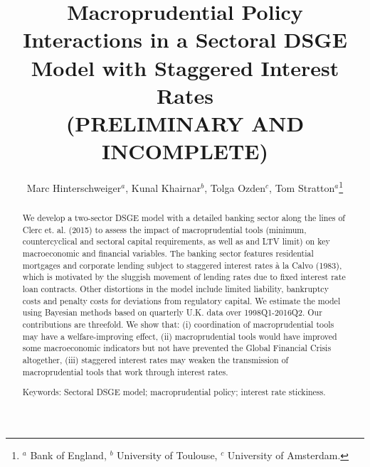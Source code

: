 \documentclass[12pt]{article}
\title{Macroprudential Policy Interactions in a Sectoral DSGE Model with Staggered Interest Rates \\
(PRELIMINARY AND INCOMPLETE)}
\author{Marc Hinterschweiger$^{a}$, Kunal Khairnar$^{b}$, Tolga Ozden$^{c}$, Tom Stratton$^{a}$\footnote{$^{a}$ Bank of England, $^{b}$ University of Toulouse, $^{c}$ University of Amsterdam.}}
\numberwithin{equation}{section}
\begin{document}
\maketitle



\begin{abstract}

We develop a two-sector DSGE model with a detailed banking sector along the lines of Clerc et. al. (2015) to assess the impact of macroprudential tools (minimum, countercyclical and sectoral capital requirements, as well as and LTV limit) on key macroeconomic and financial variables. The banking sector features residential mortgages and corporate lending subject to staggered interest rates à la Calvo (1983), which is motivated by the sluggish movement of lending rates due to fixed interest rate loan contracts. Other distortions in the model include limited liability, bankruptcy costs and penalty costs for deviations from regulatory capital. We estimate the model using Bayesian methods based on quarterly U.K. data over 1998Q1-2016Q2. Our contributions are threefold. We show that: (i) coordination of macroprudential tools may have a welfare-improving effect, (ii) macroprudential tools would have improved some macroeconomic indicators but not have prevented the Global Financial Crisis altogether, (iii) staggered interest rates may weaken the transmission of macroprudential tools that work through interest rates. 

\noindent

\vspace{3 mm}
Keywords: Sectoral DSGE model; macroprudential policy; interest rate stickiness. \\
\noindent 


	
\end{abstract}
\noindent\vspace{3 mm}
\end{document}

